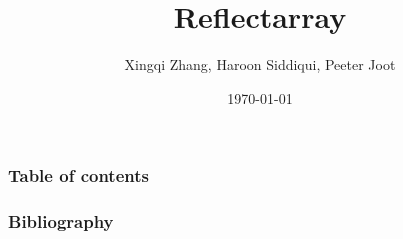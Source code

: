 \documentclass[handout]{beamer}
\begin{document}
\title{Reflectarray}
\author{Xingqi Zhang, Haroon Siddiqui, Peeter Joot}

\date{\today}

\begin{frame}
\titlepage
\end{frame}

\begin{frame}
\frametitle{Table of contents}
\tableofcontents
\end{frame}



\begin{frame}[allowframebreaks]
\frametitle{Bibliography}


\end{frame}
\end{document}
